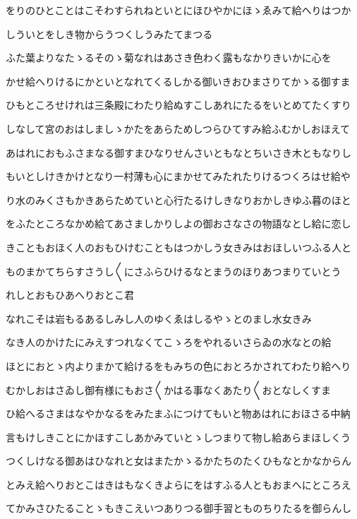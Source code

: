 \documentclass[a4paper,11pt,landscape]{ltjtarticle}
\begin{document}
\par\medskip
をりのひとことはこそわすられねといとにほひやかにほゝゑみて給へりはつか
\par\medskip
しういとをしき物からうつくしうみたてまつる
\par\medskip
ふた葉よりなたゝるそのゝ菊なれはあさき色わく露もなかりきいかに心を
\par\medskip
かせ給へりけるにかといとなれてくるしかる御いきおひまさりてかゝる御すま
\par\medskip
ひもところせけれは三条殿にわたり給ぬすこしあれにたるをいとめてたくすり
\par\medskip
しなして宮のおはしましゝかたをあらためしつらひてすみ給ふむかしおほえて
\par\medskip
あはれにおもふさまなる御すまひなりせんさいともなとちいさき木ともなりし
\par\medskip
もいとしけきかけとなり一村薄も心にまかせてみたれたりけるつくろはせ給や
\par\medskip
り水のみくさもかきあらためていと心行たるけしきなりおかしきゆふ暮のほと
\par\medskip
をふたところなかめ給てあさましかりしよの御おさなさの物語なとし給に恋し
\par\medskip
きこともおほく人のおもひけむこともはつかしう女きみはおほしいつふる人と
\par\medskip
ものまかてちらすさうし〱にさふらひけるなとまうのほりあつまりていとう
\par\medskip
れしとおもひあへりおとこ君
\par\medskip
なれこそは岩もるあるしみし人のゆくゑはしるやゝとのまし水女きみ
\par\medskip
なき人のかけたにみえすつれなくてこゝろをやれるいさらゐの水なとの給
\par\medskip
ほとにおとゝ内よりまかて給けるをもみちの色におとろかされてわたり給へり
\par\medskip
むかしおはさゐし御有様にもおさ〱かはる事なくあたり〱おとなしくすま
\par\medskip
ひ給へるさまはなやかなるをみたまふにつけてもいと物あはれにおほさる中納
\par\medskip
言もけしきことにかほすこしあかみていとゝしつまりて物し給あらまほしくう
\par\medskip
つくしけなる御あはひなれと女はまたかゝるかたちのたくひもなとかなからん
\par\medskip
とみえ給へりおとこはきはもなくきよらにをはすふる人ともおまへにところえ
\par\medskip
てかみさひたることゝもきこえいつありつる御手習とものちりたるを御らんし
\end{document}
